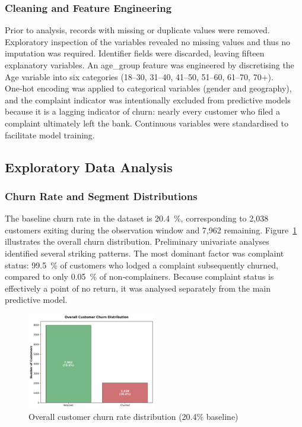 \documentclass[12pt]{article}
\begin{document}
\subsubsection{Cleaning and Feature Engineering}
Prior to analysis, records with missing or duplicate values were removed.  Exploratory inspection of the variables revealed no missing values and thus no imputation was required.  Identifier fields were discarded, leaving fifteen explanatory variables.  An age\_group feature was engineered by discretising the Age variable into six categories (18–30, 31–40, 41–50, 51–60, 61–70, 70+).  One‑hot encoding was applied to categorical variables (gender and geography), and the complaint indicator was intentionally excluded from predictive models because it is a lagging indicator of churn: nearly every customer who filed a complaint ultimately left the bank.  Continuous variables were standardised to facilitate model training.

\subsection{Exploratory Data Analysis}
\subsubsection{Churn Rate and Segment Distributions}
The baseline churn rate in the dataset is 20.4~\%, corresponding to 2,038 customers exiting during the observation window and 7,962 remaining.  Figure~\ref{fig:churn_rate} illustrates the overall churn distribution.  Preliminary univariate analyses identified several striking patterns.  The most dominant factor was complaint status: 99.5~\% of customers who lodged a complaint subsequently churned, compared to only 0.05~\% of non‑complainers.  Because complaint status is effectively a point of no return, it was analysed separately from the main predictive model.

\begin{figure}[H]
\centering
\includegraphics[width=0.5\textwidth]{img/01_overall_churn_rate.png}
\caption{Overall customer churn rate distribution (20.4\% baseline)}
\label{fig:churn_rate}
\end{figure}
\end{document}
